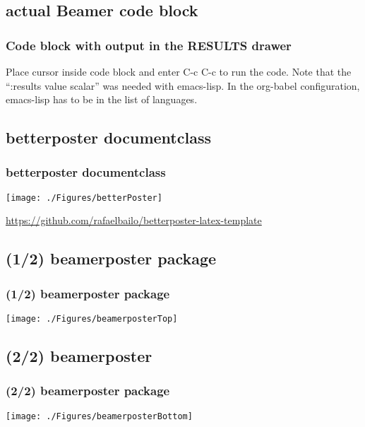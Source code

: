 \documentclass{beamer}
\begin{document}
\subsection{actual Beamer code block}
\begin{frame}
\frametitle{Code block with output in the RESULTS drawer}
Place cursor inside code block and enter C-c C-c to run the code.
\exampleCodeC
Note that the ``:results value scalar'' was needed with emacs-lisp.
In the org-babel configuration, emacs-lisp has to be in the list of languages.
\end{frame}


\subsection{betterposter documentclass}
\begin{frame}
\frametitle{betterposter documentclass}
\begin{center}
    \texttt{[image: ./Figures/betterPoster]}
\end{center}
\footnotesize{\url{https://github.com/rafaelbailo/betterposter-latex-template}}
\end{frame}
\note{}


\subsection{(1/2) beamerposter package}
\begin{frame}
\frametitle{ (1/2) beamerposter package}
\begin{center}
    \texttt{[image: ./Figures/beamerposterTop]}
\end{center}
\end{frame}


\subsection{(2/2) beamerposter}
\begin{frame}
\frametitle{(2/2) beamerposter package}
\begin{center}
    \texttt{[image: ./Figures/beamerposterBottom]}
\end{center}
\end{frame}
\note{}
\end{document}
